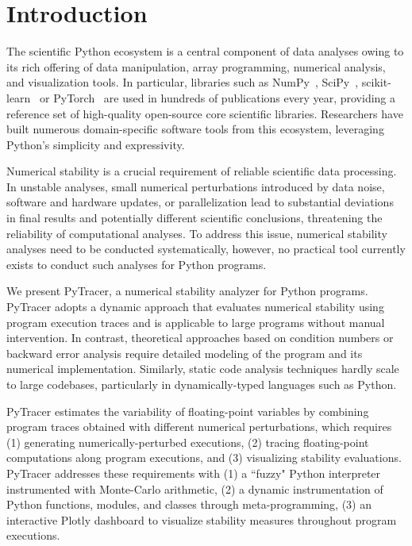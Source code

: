 \documentclass[11pt]{article}
\begin{document}
\section{Introduction}

The scientific Python ecosystem is a central component of data
analyses owing to its rich offering of data manipulation, array programming,
numerical analysis, and visualization tools. In particular, libraries such
as NumPy~\cite{harris2020array}, SciPy~\cite{virtanen2020scipy}, scikit-learn~\cite{pedregosa2011scikit} or PyTorch~\cite{paszke2019pytorch} are used in hundreds of publications every year, providing a reference set of high-quality open-source core scientific libraries. Researchers have built numerous domain-specific software tools from this ecosystem, leveraging Python's simplicity and expressivity. 

Numerical stability is a crucial requirement of reliable scientific data
processing. In unstable analyses, small numerical perturbations introduced by data noise, software and hardware updates, or parallelization lead to substantial deviations in final results and potentially different scientific conclusions, threatening the reliability of computational analyses. To address this issue, numerical stability analyses need to be conducted systematically, however, no practical tool currently exists to conduct such analyses for Python programs.

We present PyTracer, a numerical stability analyzer for Python programs.
PyTracer adopts a dynamic approach that evaluates numerical stability using program execution traces and is applicable to large programs without manual intervention. In contrast, theoretical approaches based on condition numbers or backward error analysis require detailed modeling of the program and its numerical implementation. Similarly, static code analysis techniques hardly scale to large codebases, particularly in dynamically-typed languages such as Python.

PyTracer estimates the variability of floating-point variables by combining program traces obtained with different numerical perturbations, which requires (1) generating numerically-perturbed executions, (2) tracing floating-point computations along program executions, and (3) visualizing stability evaluations. PyTracer addresses these requirements with (1) a ``fuzzy" Python interpreter instrumented with Monte-Carlo arithmetic, (2) a dynamic instrumentation of Python functions, modules, and classes through meta-programming, (3) an interactive Plotly dashboard to visualize stability measures throughout program executions.
\end{document}
